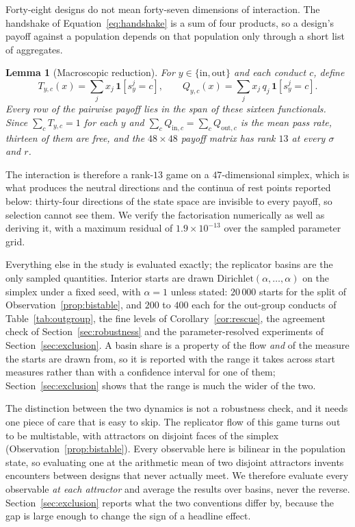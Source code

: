 \documentclass[11pt,a4paper]{article}
\newtheorem{lemma}[theorem]{Lemma}
\theoremstyle{definition}
\begin{document}
Forty-eight designs do not mean forty-seven dimensions of interaction. The
handshake of Equation~\eqref{eq:handshake} is a sum of four products, so a
design's payoff against a population depends on that population only through a
short list of aggregates.

\begin{lemma}[Macroscopic reduction]
\label{lem:rank}
For $y \in \{\mathrm{in}, \mathrm{out}\}$ and each conduct $c$, define
\begin{equation}
\label{eq:macro}
T_{y,c}(x) = \sum_{j} x_j\,\mathbf{1}\!\left[s^{j}_{y} = c\right],
\qquad
Q_{y,c}(x) = \sum_{j} x_j\, q_j\,\mathbf{1}\!\left[s^{j}_{y} = c\right].
\end{equation}
Every row of the pairwise payoff lies in the span of these sixteen functionals.
Since $\sum_c T_{y,c} = 1$ for each $y$ and $\sum_c Q_{\mathrm{in},c} =
\sum_c Q_{\mathrm{out},c}$ is the mean pass rate, thirteen of them are free, and
the $48 \times 48$ payoff matrix has rank $13$ at every $\sigma$ and $r$.
\end{lemma}

The interaction is therefore a rank-$13$ game on a $47$-dimensional simplex,
which is what produces the neutral directions and the continua of rest points
reported below: thirty-four directions of the state space are invisible to
every payoff, so selection cannot see them. We verify the factorisation
numerically as well as deriving it, with a maximum residual of
$1.9 \times 10^{-13}$ over the sampled parameter grid.

Everything else in the study is evaluated exactly; the replicator basins are
the only sampled quantities. Interior
starts are drawn $\mathrm{Dirichlet}(\alpha, \dots, \alpha)$ on the simplex
under a fixed seed, with $\alpha = 1$ unless stated: $20\,000$ starts for the
split of Observation~\ref{prop:bistable}, and $200$ to $400$ each for the
out-group conducts of Table~\ref{tab:outgroup}, the fine levels of
Corollary~\ref{cor:rescue}, the agreement check of
Section~\ref{sec:robustness} and the parameter-resolved experiments of
Section~\ref{sec:exclusion}. A basin share is a property of the flow
\emph{and} of the measure the starts are drawn from, so it is reported with the
range it takes across start measures rather than with a confidence interval for
one of them; Section~\ref{sec:exclusion} shows that the range is much the wider
of the two.

The distinction between the two dynamics is not a robustness check, and it
needs one
piece of care that is easy to skip. The replicator flow of this game turns out
to be multistable, with attractors on disjoint faces of the simplex
(Observation~\ref{prop:bistable}). Every observable here is bilinear in the
population state, so evaluating one at the arithmetic mean of two disjoint
attractors invents encounters between designs that never actually meet. We
therefore evaluate every observable \emph{at each attractor} and average the
results over basins, never the reverse. Section~\ref{sec:exclusion} reports
what the two conventions differ by, because the gap is large enough to change
the sign of a headline effect.
\end{document}
